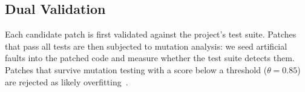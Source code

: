 \subsection{Dual Validation}

Each candidate patch is first validated against the project's test suite.
Patches that pass all tests are then subjected to mutation analysis:
we seed artificial faults into the patched code and measure whether the
test suite detects them. Patches that survive mutation testing with a
score below a threshold ($\theta{=}0.85$) are rejected as likely
overfitting~\cite{smith2015generating}.

